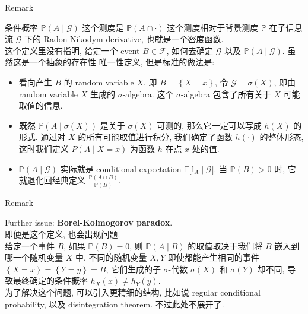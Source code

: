 \documentclass{qlnotes-export}
\begin{document}
\begin{qlremark}{Remark}

条件概率 \({\mathbb{P}}(A \mid \mathcal{G})\) 这个测度是 \({\mathbb{P}}(A \cap \cdot )\) 这个测度相对于背景测度 \(\mathbb{P}\) 在子信息流 \(\mathcal{G}\) 下的 Radon-Nikodym derivative, 也就是一个密度函数.\\
这个定义里没有指明, 给定一个 event \(B \in \mathcal{F}\), 如何去确定 \(\mathcal{G}\) 以及 \({\mathbb{P}}(A \mid \mathcal{G})\). 虽然这是一个抽象的存在性{ } 唯一性定义, 但是标准的做法是:

\begin{itemize}
\item
  看向产生 \(B\) 的 random variable \(X\), 即 \(B = \left\{ {X = x} \right\}\), 令 \(\mathcal{G} = \sigma(X)\), 即由 random variable \(X\) 生成的 \(\sigma\)-algebra. 这个 \(\sigma\)-algebra 包含了所有关于 \(X\) 可能取值的信息.
\item
  既然 \({\mathbb{P}}(A \mid \sigma(X))\) 是关于 \(\sigma(X)\) 可测的, 那么它一定可以写成 \(h(X)\) 的形式. 通过对 \(X\) 的所有可能取值进行积分, 我们确定了函数 \(h( \cdot )\) 的整体形态, 这时我们定义 \(P(A \mid X = x)\) 为函数 \(h\) 在点 \(x\) 处的值.
\item
  \({\mathbb{P}}(A \mid \mathcal{G})\) 实际就是 \href{https://qiulinfan.github.io/notes/math/probability/\#kn-conditional-expectation}{conditional expectation} \({\mathbb{E}}\lbrack{\mathbb{I}}_{A} \mid \mathcal{G}\rbrack\). 当 \({\mathbb{P}}(B) > 0\) 时, 它就退化回经典定义 \(\frac{{\mathbb{P}}(A \cap B)}{{\mathbb{P}}(B)}\).
\end{itemize}

\end{qlremark}

\begin{qlremark}{Remark}

Further issue: \textbf{Borel-Kolmogorov paradox}.\\
即便是这个定义, 也会出现问题.\\
给定一个事件 \(B\), 如果 \({\mathbb{P}}(B) = 0\), 则 \({\mathbb{P}}(A \mid B)\) 的取值取决于我们将 \(B\) 嵌入到哪一个随机变量 \(X\) 中. 不同的随机变量 \(X,Y\) 即使都能产生相同的事件 \(\left\{ {X = x} \right\} = \left\{ {Y = y} \right\} = B\), 它们生成的子 \(\sigma\)-代数 \(\sigma(X)\) 和 \(\sigma(Y)\) 却不同, 导致最终确定的条件概率 \(h_{X}(x) \neq h_{Y}(y)\).\\
为了解决这个问题, 可以引入更精细的结构, 比如说 regular conditional probability, 以及 disintegration theorem. 不过此处不展开了.

\end{qlremark}
\end{document}
